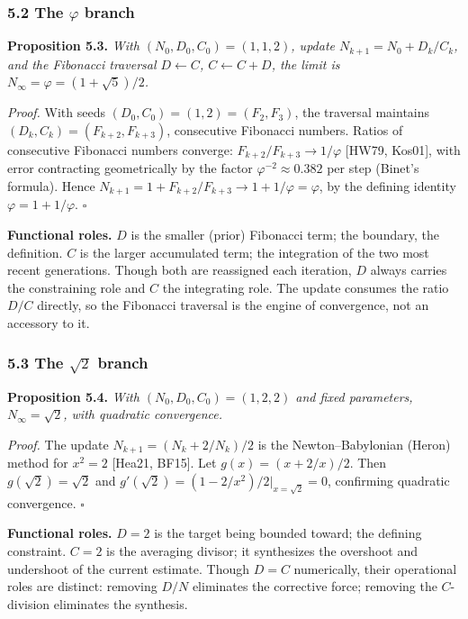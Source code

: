 \documentclass[
  11pt,
  letterpaper,
]{article}
\begin{document}
\subsubsection{\texorpdfstring{5.2 The \(\varphi\)
branch}{5.2 The \textbackslash varphi branch}}\label{the-varphi-branch}

\textbf{Proposition 5.3.} \emph{With \((N_0, D_0, C_0) = (1, 1, 2)\),
update \(N_{k+1} = N_0 + D_k/C_k\), and the Fibonacci traversal
\(D \leftarrow C\), \(C \leftarrow C + D\), the limit is
\(N_\infty = \varphi = (1+\sqrt{5})/2\).}

\emph{Proof.} With seeds \((D_0, C_0) = (1, 2) = (F_2, F_3)\), the
traversal maintains \((D_k, C_k) = (F_{k+2}, F_{k+3})\), consecutive
Fibonacci numbers. Ratios of consecutive Fibonacci numbers converge:
\(F_{k+2}/F_{k+3} \to 1/\varphi\) {[}HW79, Kos01{]}, with error
contracting geometrically by the factor \(\varphi^{-2} \approx 0.382\)
per step (Binet's formula). Hence
\(N_{k+1} = 1 + F_{k+2}/F_{k+3} \to 1 + 1/\varphi = \varphi\), by the
defining identity \(\varphi = 1 + 1/\varphi\). \(\square\)

\textbf{Functional roles.} \(D\) is the smaller (prior) Fibonacci term;
the boundary, the definition. \(C\) is the larger accumulated term; the
integration of the two most recent generations. Though both are
reassigned each iteration, \(D\) always carries the constraining role
and \(C\) the integrating role. The update consumes the ratio \(D/C\)
directly, so the Fibonacci traversal is the engine of convergence, not
an accessory to it.

\subsubsection{\texorpdfstring{5.3 The \(\sqrt{2}\)
branch}{5.3 The \textbackslash sqrt\{2\} branch}}\label{the-sqrt2-branch}

\textbf{Proposition 5.4.} \emph{With \((N_0, D_0, C_0) = (1, 2, 2)\) and
fixed parameters, \(N_\infty = \sqrt{2}\), with quadratic convergence.}

\emph{Proof.} The update \(N_{k+1} = (N_k + 2/N_k)/2\) is the
Newton--Babylonian (Heron) method for \(x^2 = 2\) {[}Hea21, BF15{]}. Let
\(g(x) = (x + 2/x)/2\). Then \(g(\sqrt{2}) = \sqrt{2}\) and
\(g'(\sqrt{2}) = (1 - 2/x^2)/2\big|_{x=\sqrt{2}} = 0\), confirming
quadratic convergence. \(\square\)

\textbf{Functional roles.} \(D = 2\) is the target being bounded toward;
the defining constraint. \(C = 2\) is the averaging divisor; it
synthesizes the overshoot and undershoot of the current estimate. Though
\(D = C\) numerically, their operational roles are distinct: removing
\(D/N\) eliminates the corrective force; removing the \(C\)-division
eliminates the synthesis.
\end{document}
